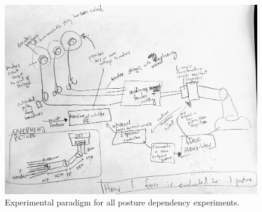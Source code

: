\documentclass[utf8]{frontiersSCNS} %
\begin{document}


\begin{figure}[h!]
\begin{center}
\includegraphics[width=17.5cm]{figures/overview/overview.jpg}%
\end{center}
\caption{Experimental paradigm for all posture dependency experiments.}
\label{fig:overview}
\end{figure}
\end{document}
